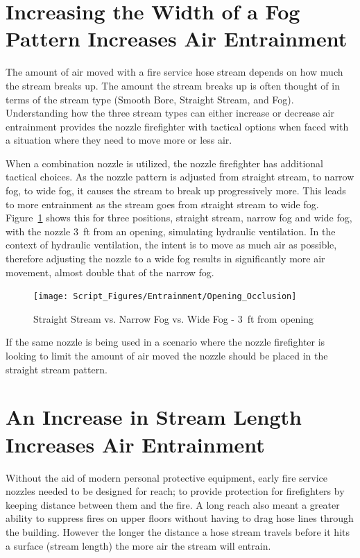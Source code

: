 \documentclass[12pt,oneside]{book}
\begin{document}
\section{Increasing the Width of a Fog Pattern Increases Air Entrainment}
The amount of air moved with a fire service hose stream depends on how much the stream breaks up. The amount the stream breaks up is often thought of in terms of the stream type (Smooth Bore, Straight Stream, and Fog). Understanding how the three stream types can either increase or decrease air entrainment provides the nozzle firefighter with tactical options when faced with a situation where they need to move more or less air. 

When a combination nozzle is utilized, the nozzle firefighter has additional tactical choices. As the nozzle pattern is adjusted from straight stream, to narrow fog, to wide fog, it causes the stream to break up progressively more. This leads to more entrainment as the stream goes from straight stream to wide fog. Figure~\ref{fig:StraightStream_Fog_Comp} shows this for three positions, straight stream, narrow fog and wide fog, with the nozzle 3~ft from an opening, simulating hydraulic ventilation. In the context of hydraulic ventilation, the intent is to move as much air as possible, therefore adjusting the nozzle to a wide fog results in significantly more air movement, almost double that of the narrow fog.  

\begin{figure}[H]
\centering
\texttt{[image: Script\_Figures/Entrainment/Opening\_Occlusion]}
\caption{Straight Stream vs. Narrow Fog vs. Wide Fog - 3~ft from opening}
\label{fig:StraightStream_Fog_Comp}
\end{figure}

If the same nozzle is being used in a scenario where the nozzle firefighter is looking to limit the amount of air moved the nozzle should be placed in the straight stream pattern. 

\section{An Increase in Stream Length Increases Air Entrainment}
Without the aid of modern personal protective equipment, early fire service nozzles needed to be designed for reach; to provide protection for firefighters by keeping distance between them and the fire. A long reach also meant a greater ability to suppress fires on upper floors without having to drag hose lines through the building. However the longer the distance a hose stream travels before it hits a surface (stream length) the more air the stream will entrain.
\end{document}
